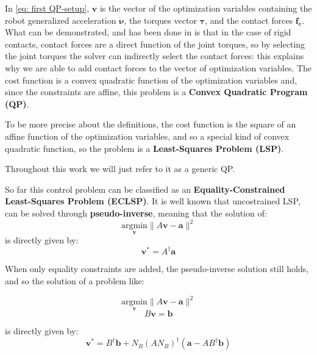 In \eqref{eq: first QP-setup}, $\mathbf{v}$ is the vector of the optimization variables containing the robot generalized acceleration $\bm{\dot{\nu}}$, the torques vector $\bm{\tau}$, and the contact forces $\mathbf{f_{c}}$.
What can be demonstrated, and has been done in \cite{Mistry-et-al, Park_Khatib_2008} is that in the case of rigid contacts, contact forces are a direct function of the joint torques, so by selecting the joint torques the solver can indirectly select the contact forces: this explains why we are able to add contact forces to the vector of optimization variables.
The cost function is a convex quadratic function of the optimization variables and, since the constraints are affine, this problem is a \textbf{Convex Quadratic Program (QP)}.

To be more precise about the definitions, the cost function is the square of an affine function of the optimization variables, and so a special kind of convex quadratic function, so the problem is a \textbf{Least-Squares Problem (LSP)}.

Throughout this work we will just refer to it as a generic QP.

So far this control problem can be classified as an \textbf{Equality-Constrained Least-Squares Problem (ECLSP)}.
It is well known that uncostrained LSP, can be solved through \textbf{pseudo-inverse}, meaning that the solution of: 
\begin{equation*}
    \underset{\mathbf{v}}{\text{argmin}} \| A\mathbf{v} - \mathbf{a}\|^{2}
\end{equation*}
is directly given by:
\begin{equation*}
    \mathbf{v}^{*} = A^\dagger \mathbf{a}
\end{equation*}

When only equality constraints are added, the pseudo-inverse solution still holds, and so the solution of a problem like:

\begin{center}
\begin{equation*}
    \underset{\mathbf{v}}{\text{argmin}} \| A\mathbf{v} - \mathbf{a}\|^{2}
\end{equation*}
\begin{equation*}
    B\mathbf{v} = \mathbf{b}
\end{equation*}

\end{center}

is directly given by:
\begin{equation*}
    \mathbf{v}^{*} = B^{\dagger}\mathbf{b} + N_B (AN_B)^{\dagger}(\mathbf{a} - AB^{\dagger}\mathbf{b})
\end{equation*}

